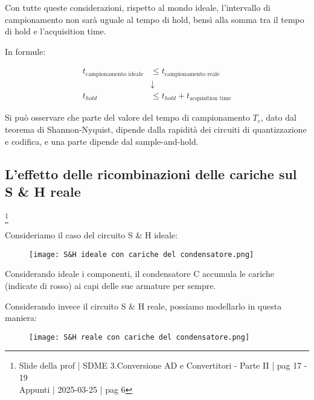 Con tutte queste considerazioni, rispetto al mondo ideale, l'intervallo di campionamento 
non sarà uguale al tempo di hold, bensì alla somma tra il tempo di hold e l'acquisition time. \newline 

In formule: 

{
    \Large 
    \begin{equation}
        \begin{split}
            t_\text{campionamento ideale} &\le t_\text{campionamento reale}
            \\
            &\downarrow
            \\
            t_{hold} &\le t_{hold} + t_\text{acquisition time}
        \end{split}
    \end{equation}
}

Si può osservare che parte del valore del tempo di campionamento $T_c$, 
dato dal teorema di Shannon-Nyquist, dipende dalla rapidità dei circuiti di quantizzazione e codifica, 
e una parte dipende dal sample-and-hold. \newline 


\newpage 

\subsection{L'effetto delle ricombinazioni delle cariche sul S \& H reale} 
\footnote{Slide della prof | SDME 3.Conversione AD e Convertitori - Parte II | pag 17 - 19 \\  
Appunti | 2025-03-25 | pag 6} 

Consideriamo il caso del circuito S \& H ideale: 

\begin{figure}[h]
    \centering
    \texttt{[image: S\&H ideale con cariche del condensatore.png]}
\end{figure}

Considerando ideale i componenti, il condensatore C accumula le cariche (indicate di rosso) ai capi delle sue armature per sempre. \newline

Considerando invece il circuito S \& H reale, possiamo modellarlo in questa maniera: 

\begin{figure}[h]
    \centering
    \texttt{[image: S\&H reale con cariche del condensatore.png]}
\end{figure}

